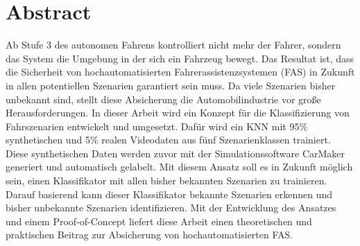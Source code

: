 

\chapter*{Abstract}

Ab Stufe 3 des autonomen Fahrens kontrolliert nicht mehr der Fahrer, sondern das System die Umgebung in der sich ein Fahrzeug bewegt. Das Resultat ist, dass die Sicherheit von hochautomatisierten Fahrerassistenzsystemen (\acs{FAS}) in Zukunft in allen potentiellen Szenarien garantiert sein muss. Da viele Szenarien bisher unbekannt sind, stellt diese Absicherung die Automobilindustrie vor große Herausforderungen. In dieser Arbeit wird ein Konzept für die Klassifizierung von Fahrszenarien entwickelt und umgesetzt. Dafür wird ein \ac{KNN} mit 95\% synthetischen und 5\% realen Videodaten aus fünf Szenarienklassen trainiert. Diese synthetischen Daten werden zuvor mit der Simulationssoftware CarMaker generiert und automatisch gelabelt. Mit diesem Ansatz soll es in Zukunft möglich sein, einen Klassifikator mit allen bisher bekannten Szenarien zu trainieren. Darauf basierend kann dieser Klassifikator bekannte Szenarien erkennen und bisher unbekannte Szenarien identifizieren. Mit der Entwicklung des Ansatzes und einem Proof-of-Concept liefert diese Arbeit einen theoretischen und praktischen Beitrag zur Absicherung von hochautomatisierten \acs{FAS}.

